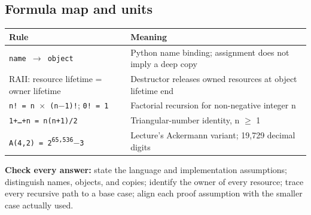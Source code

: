 \documentclass[11pt]{article}
\begin{document}
\begin{keepsection}
\section{Formula map and units}

\begin{center}\small\begin{tabularx}{\linewidth}{>{\raggedright\arraybackslash}X>{\raggedright\arraybackslash}X}\toprule
\textbf{Rule} & \textbf{Meaning} \\ \midrule
\texttt{name \ensuremath{\to} object} & Python name binding; assignment does not imply a deep copy \\
RAII: resource lifetime = owner lifetime & Destructor releases owned resources at object lifetime end \\
\texttt{n! = n \ensuremath{\times} (n\ensuremath{-}1)!}; \texttt{0! = 1} & Factorial recursion for non-negative integer n \\
\texttt{1+…+n = n(n+1)/2} & Triangular-number identity, n \ensuremath{\geq} 1 \\
\texttt{A(4,2) = 2\textsuperscript{65,536}\ensuremath{-}3} & Lecture’s Ackermann variant; 19,729 decimal digits \\
\bottomrule\end{tabularx}\end{center}

\begin{notebox}\textbf{Check every answer:} state the language and implementation assumptions; distinguish names, objects, and copies; identify the owner of every resource; trace every recursive path to a base case; align each proof assumption with the smaller case actually used.\end{notebox}
\end{keepsection}
\end{document}
